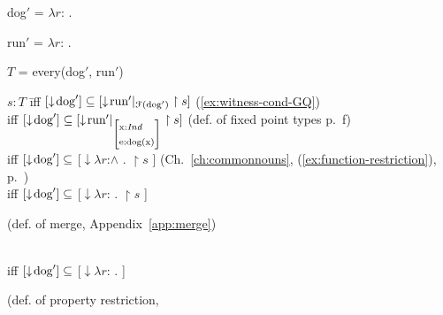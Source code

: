 \begin{ex} 
\begin{subex} 
 
\item dog$'$ = $\lambda r$:
    .  

run$'$ = $\lambda r$:
    . 
 
\item $T$ = every(dog$'$, run$'$)

\item \begin{tabbing}
$s:T$ \=iff
$[\downarrow\!\text{dog}']\subseteq[\downarrow\!\text{run}'|_{\mathcal{F}(\text{dog}')}\restriction
s]  $ \hspace*{2em}(\ref{ex:witness-cond-GQ})\\
\> iff  $\downP{\text{dog}'}\subseteq\downP{\text{run}'|_{\text{\smallrecord{\smalltfield{x}{\textit{Ind}}\\\smalltfield{e}{dog(x)}}}}\restriction
s}  $ \hspace*{2em}(def. of fixed point types p.~\pageref{pg:fixedpointtype}f)\\
\> iff $[\downarrow\!\text{dog}']\subseteq$ [$\downarrow\lambda
r$:\d{$\wedge$}
     . $\restriction s$ ] \hspace*{2em} (Ch.~\ref{ch:commonnouns},
(\ref{ex:function-restriction}), p.~\pageref{ex:function-restriction})\\
\> iff $[\downarrow\!\text{dog}']\subseteq$ [$\downarrow\lambda r$:
     . $\restriction s$ ]
     \hspace*{2em}\begin{minipage}{.3\textwidth}(def. of merge, Appendix~\ref{app:merge})\end{minipage}\\
\> iff $[\downarrow\!\text{dog}']\subseteq$ [$\downarrow\lambda r$:
     . 
     ]\hspace*{2em}\begin{minipage}{.3\textwidth}(def. of property restriction,

\end{minipage}
\end{tabbing}
\end{subex}
\end{ex}
